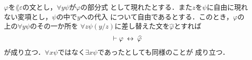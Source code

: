 	\begin{screen}
		\begin{logicalthm}[束縛された変項を取り替えても同値]
		\label{logicalthm:equivalence_by_replacing_bound_variables}
			$\varphi$を$\lang{\varepsilon}$の文とし，$\forall y \psi$が$\varphi$の部分式
			として現れたとする．また$z$を$\psi$に自由に現れない変項とし，$\psi$の中で$y$への代入
			について自由であるとする．このとき，$\varphi$の上の$\forall y \psi$のその一か所を
			$\forall z \psi(y/z)$に差し替えた文を$\widehat{\varphi}$とすれば
			\begin{align}
				\vdash \varphi \hspace{0.25em}\leftrightarrow\hspace{0.25em} \widehat{\varphi}
			\end{align}
			が成り立つ．$\forall x \psi$ではなく$\exists x \psi$であったとしても同様のことが
			成り立つ．
		\end{logicalthm}
	\end{screen}
	
